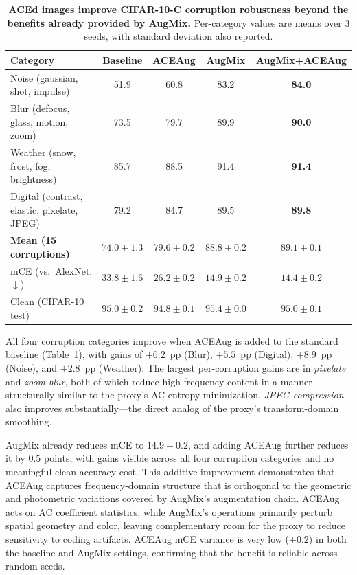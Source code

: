 \documentclass{article}
\theoremstyle{definition}
\begin{document}
\begin{table}[h]
  \centering
  \small
  \caption{
    \textbf{ACEd images improve CIFAR-10-C corruption robustness beyond the benefits already provided by AugMix.}
    Per-category values are means over 3 seeds, with standard deviation also reported.}
  \label{tab:cifar_c}
  \begin{tabular}{lcccc}
    \toprule
    Category & Baseline & ACEAug & AugMix & AugMix+ACEAug \\
    \midrule
    Noise (gaussian, shot, impulse)             & 51.9 & 60.8 & 83.2 & \textbf{84.0} \\
    Blur (defocus, glass, motion, zoom)          & 73.5 & 79.7 & 89.9 & \textbf{90.0} \\
    Weather (snow, frost, fog, brightness)      & 85.7 & 88.5 & 91.4 & \textbf{91.4} \\
    Digital (contrast, elastic, pixelate, JPEG) & 79.2 & 84.7 & 89.5 & \textbf{89.8} \\
    \midrule
    \textbf{Mean (15 corruptions)}              & $74.0 \pm 1.3$ & $79.6 \pm 0.2$ & $88.8 \pm 0.2$ & $\mathbf{89.1 \pm 0.1}$ \\
    mCE (vs.\ AlexNet, $\downarrow$)            & $33.8 \pm 1.6$ & $26.2 \pm 0.2$ & $14.9 \pm 0.2$ & $\mathbf{14.4 \pm 0.2}$ \\
    \midrule
    Clean (CIFAR-10 test)                       & $95.0 \pm 0.2$ & $94.8 \pm 0.1$ & $95.4 \pm 0.0$ & $95.0 \pm 0.1$ \\
    \bottomrule
  \end{tabular}
\end{table}

All four corruption categories improve when ACEAug is added to the standard baseline (Table~\ref{tab:cifar_c}), with gains of $+6.2$~pp (Blur), $+5.5$~pp (Digital), $+8.9$~pp (Noise), and $+2.8$~pp (Weather).
The largest per-corruption gains are in \emph{pixelate} and \emph{zoom blur}, both of which reduce high-frequency content in a manner structurally similar to the proxy's AC-entropy minimization.
\emph{JPEG compression} also improves substantially---the direct analog of the proxy's transform-domain smoothing.

AugMix already reduces mCE to $14.9 \pm 0.2$, and adding ACEAug further reduces it by $0.5$ points, with gains visible across all four corruption categories and no meaningful clean-accuracy cost.
This additive improvement demonstrates that ACEAug captures frequency-domain structure that is orthogonal to the geometric and photometric variations covered by AugMix's augmentation chain.
ACEAug acts on AC coefficient statistics, while AugMix's operations primarily perturb spatial geometry and color, leaving complementary room for the proxy to reduce sensitivity to coding artifacts.
ACEAug mCE variance is very low ($\pm 0.2$) in both the baseline and AugMix settings, confirming that the benefit is reliable across random seeds.
\end{document}
